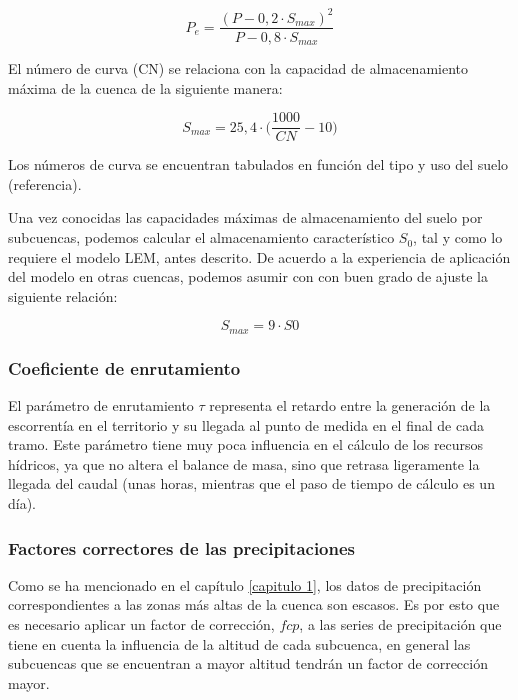 \begin{equation}
    P_e=\frac{(P-0,2\cdot S_{max})^2}{P-0,8\cdot S_{max}}
\end{equation}


El número de curva (CN) se relaciona con la capacidad de almacenamiento máxima de la cuenca de la siguiente manera:

\begin{equation}
    S_{max}=25,4\cdot\bigg(\frac{1000}{CN}-10\bigg)
\end{equation}

Los números de curva se encuentran tabulados en función del tipo y uso del suelo (referencia).

Una vez conocidas las capacidades máximas de almacenamiento del suelo por subcuencas, podemos calcular el 
almacenamiento característico $S_0$, tal y como lo requiere el modelo LEM, antes descrito. 
De acuerdo a la experiencia de aplicación del modelo en otras cuencas, podemos asumir con  con buen grado de 
ajuste la siguiente relación:

\begin{equation}
    S_{max}=9\cdot S0
\end{equation}

\subsubsection{Coeficiente de enrutamiento}

El parámetro de enrutamiento $\tau$ representa el retardo entre la generación 
de la escorrentía en el territorio y su llegada al punto de medida en el final de cada tramo. Este parámetro 
tiene muy poca influencia en el cálculo de los recursos hídricos, ya que no altera el balance de masa, sino que 
retrasa ligeramente la llegada del caudal (unas horas, mientras que el paso de tiempo de cálculo es un día). 

\subsubsection{Factores correctores de las precipitaciones}
Como se ha mencionado en el capítulo \ref{capitulo 1}, los datos de precipitación correspondientes a las zonas más 
altas de la cuenca son escasos. Es por esto que es necesario aplicar un factor de corrección, $fcp$, a las series de precipitación
que tiene en cuenta la influencia de la altitud de cada subcuenca, en general las subcuencas que se encuentran a mayor
altitud tendrán un factor de corrección mayor. 


